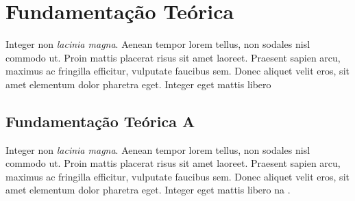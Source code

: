 \chapter{Fundamentação Teórica}
\label{cap:fundamentacao-teorica}

Integer non \textit{lacinia magna}. Aenean tempor lorem tellus, non sodales nisl commodo ut. Proin mattis placerat risus sit amet laoreet. Praesent sapien arcu, maximus ac fringilla efficitur, vulputate faucibus sem. Donec aliquet velit eros, sit amet elementum dolor pharetra eget. Integer eget mattis libero

\section{Fundamentação Teórica A}
\label{sec:fundamentacao-teorica-a}

Integer non \textit{lacinia magna}. Aenean tempor lorem tellus, non sodales nisl commodo ut. Proin mattis placerat risus sit amet laoreet. Praesent sapien arcu, maximus ac fringilla efficitur, vulputate faucibus sem. Donec aliquet velit eros, sit amet elementum dolor pharetra eget. Integer eget mattis libero na \cite{johnsen2005peer}.

	\begin{figure}[h!]
		\centering
	\end{figure}

